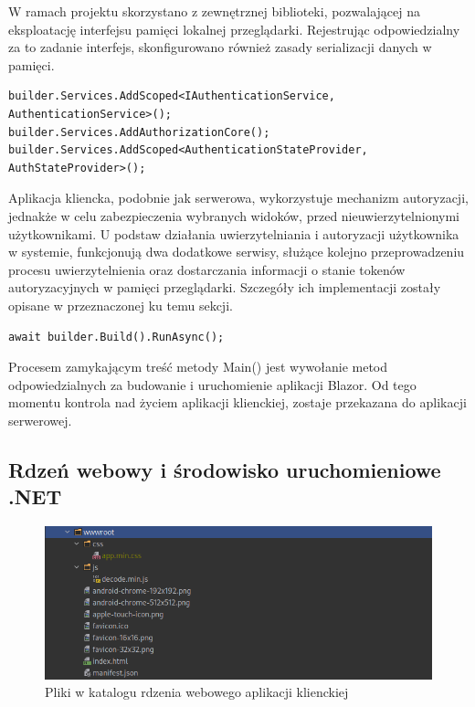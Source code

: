 W ramach projektu skorzystano z zewnętrznej biblioteki, pozwalającej na eksploatację interfejsu pamięci lokalnej przeglądarki. Rejestrując odpowiedzialny za to zadanie interfejs, skonfigurowano również zasady serializacji danych w pamięci.

\begin{lstlisting}[language=CSharp, caption={Rejestracja serwisów związanych z autoryzacją i uwierzytelnieniem użytkownika, w aplikacji klienckiej}, label=lst:blazor_auth]
builder.Services.AddScoped<IAuthenticationService, AuthenticationService>();
builder.Services.AddAuthorizationCore();
builder.Services.AddScoped<AuthenticationStateProvider, AuthStateProvider>();
\end{lstlisting}

Aplikacja kliencka, podobnie jak serwerowa, wykorzystuje mechanizm autoryzacji, jednakże w celu zabezpieczenia wybranych widoków, przed nieuwierzytelnionymi użytkownikami. U podstaw działania uwierzytelniania i autoryzacji użytkownika w systemie, funkcjonują dwa dodatkowe serwisy, służące kolejno przeprowadzeniu procesu uwierzytelnienia oraz dostarczania informacji o stanie tokenów autoryzacyjnych w pamięci przeglądarki. Szczegóły ich implementacji zostały opisane w przeznaczonej ku temu sekcji.

\begin{lstlisting}[language=CSharp, caption={Wywołanie metody budującej i uruchamiającej aplikację kliencką}, label=lst:blazor_run]
await builder.Build().RunAsync();
\end{lstlisting}
 
Procesem zamykającym treść metody Main() jest wywołanie metod odpowiedzialnych za budowanie i uruchomienie aplikacji Blazor. Od tego momentu kontrola nad życiem aplikacji klienckiej, zostaje przekazana do aplikacji serwerowej.

\subsection{Rdzeń webowy i środowisko uruchomieniowe .NET}

\begin{figure}[!htbp] 
    \centering
    \includegraphics[width=\textwidth]{img/chapter5/wwwroot.png}
    \caption{Pliki w katalogu rdzenia webowego aplikacji klienckiej}
    \label{fig:wwwroot}
\end{figure}

